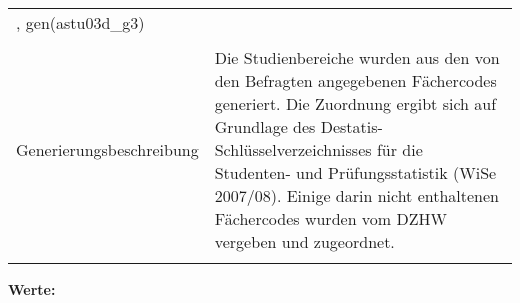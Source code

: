 \begin{tabular}{lL{11.3cm}}
, gen(astu03d\_g3) \\
				 \\
					Generierungsbeschreibung & Die Studienbereiche wurden aus den von den Befragten angegebenen Fächercodes generiert. Die Zuordnung ergibt sich auf Grundlage des Destatis-Schlüsselverzeichnisses für die Studenten- und Prüfungsstatistik (WiSe 2007/08).  Einige darin nicht enthaltenen Fächercodes wurden vom DZHW vergeben und zugeordnet. 
				 \\	
			 \\
		\end{tabular}






			\vspace*{1 cm}
			\noindent\textbf{Werte:}\\
